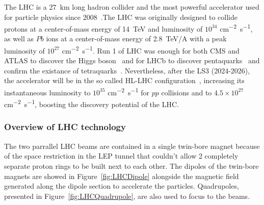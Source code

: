 	The LHC is a \SI{27}{km} long hadron collider and the most powerful accelerator used for particle physics since 2008~\cite{LHC2008}.The LHC was originally designed to collide protons at a center-of-mass energy of \SI{14}{TeV} and luminosity of $10^{34}$ \si{cm^{-2}s^{-1}}, as well as $Pb$ ions at a center-of-mass energy of \SI{2.8}{TeV/A} with a peak luminosity of $10^{27}$ \si{cm^{-2}s^{-1}}. Run 1 of LHC was enough for both CMS and ATLAS to discover the Higgs boson~\cite{HIGGS2015} and for LHCb to discover pentaquarks~\cite{PENTAQUARK2015} and confirm the existance of tetraquarks~\cite{TETRAQUARK2017}. Nevertheless, after the \acf{LS3} (2024-2026), the accelerator will be in the so called \acf{HL-LHC} configuration~\cite{HLLHC2017}, increasing its instantaneous luminosity to $10^{35}$ \si{cm^{-2}s^{-1}} for $pp$ collisions and to $4.5\times 10^{27}$ \si{cm^{-2}s^{-1}}, boosting the discovery potential of the LHC.
	
		\subsubsection{Overview of LHC technology}
		\label{chapt2:sssec:LHCtechno}
	
	The two parrallel LHC beams are contained in a single twin-bore magnet because of the space restriction in the LEP tunnel that couldn't allow 2 completely separate proton rings to be built next to each other. The dipoles of the twin-bore magnets are showed in Figure~\ref{fig:LHCDipole} alongside the magnetic field generated along the dipole section to accelerate the particles. Quadrupoles, presented in Figure~\ref{fig:LHCQuadrupole}, are also used to focus to the beams.
	
